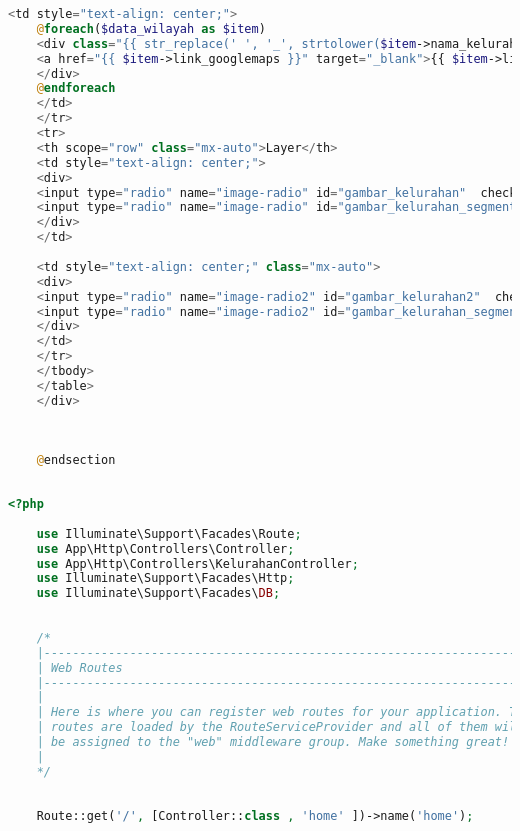 \begin{lstlisting}[language=PHP, caption=homePage.php]
	<td style="text-align: center;">
	@foreach($data_wilayah as $item)
	<div class="{{ str_replace(' ', '_', strtolower($item->nama_kelurahan)) }}2 box2"> 
	<a href="{{ $item->link_googlemaps }}" target="_blank">{{ $item->link_googlemaps }}</a>    
	</div>
	@endforeach
	</td>
	</tr>
	<tr>
	<th scope="row" class="mx-auto">Layer</th>
	<td style="text-align: center;">
	<div>
	<input type="radio" name="image-radio" id="gambar_kelurahan"  checked> Citra Satelit
	<input type="radio" name="image-radio" id="gambar_kelurahan_segmentasi" > Segmentasi
	</div>
	</td>
	
	<td style="text-align: center;" class="mx-auto">
	<div>
	<input type="radio" name="image-radio2" id="gambar_kelurahan2"  checked> Citra Satelit
	<input type="radio" name="image-radio2" id="gambar_kelurahan_segmentasi2" > Segmentasi
	</div>
	</td>
	</tr>
	</tbody>
	</table>
	</div>
	
	
	
	@endsection
	

\end{lstlisting}

\begin{lstlisting}[language=PHP, caption=web.php]
	<?php
	
	use Illuminate\Support\Facades\Route;
	use App\Http\Controllers\Controller;
	use App\Http\Controllers\KelurahanController;
	use Illuminate\Support\Facades\Http;
	use Illuminate\Support\Facades\DB;
	
	
	/*
	|--------------------------------------------------------------------------
	| Web Routes
	|--------------------------------------------------------------------------
	|
	| Here is where you can register web routes for your application. These
	| routes are loaded by the RouteServiceProvider and all of them will
	| be assigned to the "web" middleware group. Make something great!
	|
	*/
	
	
	Route::get('/', [Controller::class , 'home' ])->name('home');
	
\end{lstlisting}
% 


